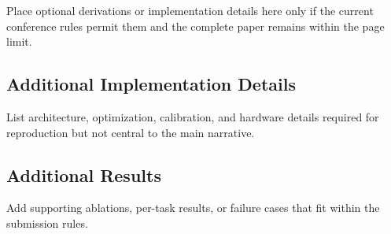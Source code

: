 Place optional derivations or implementation details here only if the current
conference rules permit them and the complete paper remains within the page
limit.

\subsection{Additional Implementation Details}

List architecture, optimization, calibration, and hardware details required for
reproduction but not central to the main narrative.

\subsection{Additional Results}

Add supporting ablations, per-task results, or failure cases that fit within the
submission rules.
